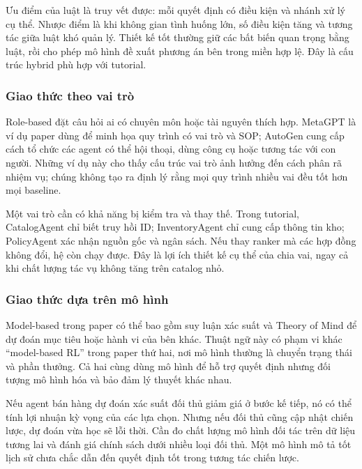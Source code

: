 Ưu điểm của luật là truy vết được: mỗi quyết định có điều kiện và nhánh
xử lý cụ thể. Nhược điểm là khi không gian tình huống lớn, số điều kiện
tăng và tương tác giữa luật khó quản lý. Thiết kế tốt thường giữ các bất
biến quan trọng bằng luật, rồi cho phép mô hình đề xuất phương án bên
trong miền hợp lệ. Đây là cấu trúc hybrid phù hợp với tutorial.

\subsubsection{Giao thức theo vai
trò}\label{giao-thux1ee9c-theo-vai-truxf2}

Role-based đặt câu hỏi ai có chuyên môn hoặc tài nguyên thích hợp.
MetaGPT là ví dụ paper dùng để minh họa quy trình có vai trò và SOP;
AutoGen cung cấp cách tổ chức các agent có thể hội thoại, dùng công cụ
hoặc tương tác với con người. Những ví dụ này cho thấy cấu trúc vai trò
ảnh hưởng đến cách phân rã nhiệm vụ; chúng không tạo ra định lý rằng mọi
quy trình nhiều vai đều tốt hơn mọi baseline. \cite{metagpt,autogen}

Một vai trò cần có khả năng bị kiểm tra và thay thế. Trong tutorial,
CatalogAgent chỉ biết truy hồi ID; InventoryAgent chỉ cung cấp thông tin
kho; PolicyAgent xác nhận nguồn gốc và ngân sách. Nếu thay ranker mà các
hợp đồng không đổi, hệ còn chạy được. Đây là lợi ích thiết kế cụ thể của
chia vai, ngay cả khi chất lượng tác vụ không tăng trên catalog nhỏ.

\subsubsection{Giao thức dựa trên mô
hình}\label{giao-thux1ee9c-dux1ef1a-truxean-muxf4-huxecnh}

Model-based trong paper có thể bao gồm suy luận xác suất và Theory of
Mind để dự đoán mục tiêu hoặc hành vi của bên khác. Thuật ngữ này có
phạm vi khác ``model-based RL'' trong paper thứ hai, nơi mô hình thường
là chuyển trạng thái và phần thưởng. Cả hai cùng dùng mô hình để hỗ trợ
quyết định nhưng đối tượng mô hình hóa và bảo đảm lý thuyết khác nhau.

Nếu agent bán hàng dự đoán xác suất đối thủ giảm giá ở bước kế tiếp, nó
có thể tính lợi nhuận kỳ vọng của các lựa chọn. Nhưng nếu đối thủ cũng
cập nhật chiến lược, dự đoán vừa học sẽ lỗi thời. Cần đo chất lượng mô
hình đối tác trên dữ liệu tương lai và đánh giá chính sách dưới nhiều
loại đối thủ. Một mô hình mô tả tốt lịch sử chưa chắc dẫn đến quyết định
tốt trong tương tác chiến lược.

